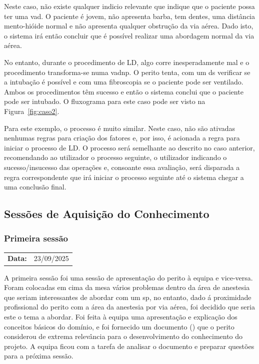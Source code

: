 \documentclass[a4paper,12pt,twoside]{article}
\begin{document}
    Neste caso, não existe qualquer indicio relevante que indique que o paciente possa ter uma \gls{vad}. O paciente é jovem, não apresenta barba, tem dentes, uma distância mento-hióide normal e não apresenta qualquer obstrução da via aérea. Dado isto, o sistema irá então concluir que é possível realizar uma abordagem normal da via aérea. 
    
    No entanto, durante o procedimento de \gls{LD}, algo corre inesperadamente mal e o procedimento transforma-se numa \gls{vadnp}. O perito tenta, com um \gls{ds} verificar se a intubação é possível e com uma \gls{fibroscopia} se o paciente pode ser ventilado. Ambos os procedimentos têm sucesso e então o sistema conclui que o paciente pode ser intubado. O fluxograma para este caso pode ser visto na Figura~\ref{fig:caso2}.

    Para este exemplo, o processo é muito similar. Neste caso, não são ativadas nenhumas regras para criação dos fatores e, por isso, é acionada a regra para iniciar o processo de \gls{LD}. O processo será semelhante ao descrito no caso anterior, recomendando ao utilizador o processo seguinte, o utilizador indicando o sucesso/insucesso das operações e, consoante essa avaliação, será disparada a regra correspondente que irá iniciar o processo seguinte até o sistema chegar a uma conclusão final.

    \subsection{Sessões de Aquisição do Conhecimento}
    \subsubsection{Primeira sessão}
    \begin{tabularx}{0.6\textwidth}{@{}lX@{}}
        \textbf{Data:} & 23/09/2025 \\
    \end{tabularx}

    A primeira sessão foi uma sessão de apresentação do perito à equipa e vice-versa. Foram colocadas em cima da mesa vários problemas dentro da área de anestesia que seriam interessantes de abordar com um \gls{sp}, no entanto, dado á proximidade profissional do perito com a área da anestesia por via aérea, foi decidido que seria este o tema a abordar. Foi feita à equipa uma apresentação e explicação dos conceitos básicos do domínio, e foi fornecido um documento (\cite{consensosva}) que o perito considerou de extrema relevância para o desenvolvimento do conhecimento do projeto. A equipa ficou com a tarefa de analisar o documento e preparar questões para a próxima sessão.
\end{document}
